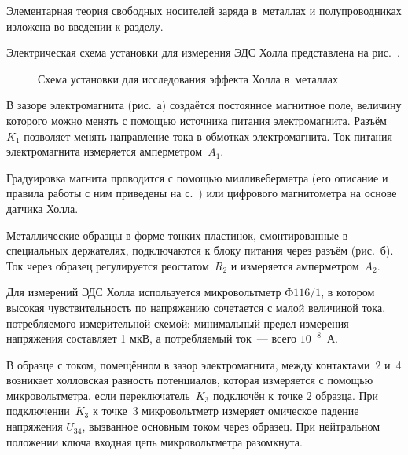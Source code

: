 


Элементарная теория свободных носителей заряда в~металлах и полупроводниках
изложена во введении к разделу.


\experiment Электрическая схема установки для измерения ЭДС Холла представлена
на рис.~.

\begin{figure}[h!]
	\caption{Схема установки для исследования эффекта Холла в~металлах}
\end{figure}

В зазоре электромагнита (рис.~а) создаётся постоянное магнитное
поле, величину которого можно менять с помощью источника питания электромагнита.
Разъём~$K_1$ позволяет менять направление тока в обмотках электромагнита. Ток
питания электромагнита измеряется амперметром~$A_1$.

Градуировка магнита проводится с помощью милливеберметра (его описание и правила
работы с ним приведены на с.~\pageref{MWB}) или цифрового магнитометра на основе
датчика Холла.

Металлические образцы в форме тонких пластинок, смонтированные в специальных
держателях, подключаются к блоку питания через разъём (рис.~б).
Ток через образец регулируется реостатом~$R_2$ и измеряется амперметром~$A_2$.

Для измерений ЭДС Холла используется микровольтметр $\text{Ф}116/1$, в котором
высокая чувствительность по напряжению сочетается с малой величиной тока,
потребляемого измерительной схемой: минимальный предел измерения напряжения
составляет 1 мкВ, а потребляемый ток~--- всего $10^{-8}$~А.

В образце с током, помещённом в зазор электромагнита, между контактами~2 и~4
возникает холловская разность потенциалов, которая измеряется с помощью
микровольтметра, если переключатель~$K_3$ подключён к точке 2 образца. При
подключении~$K_3$ к точке~3 микровольтметр измеряет омическое падение напряжения
$U_{34}$, вызванное основным током через образец. При нейтральном положении
ключа входная цепь микровольтметра разомкнута.

